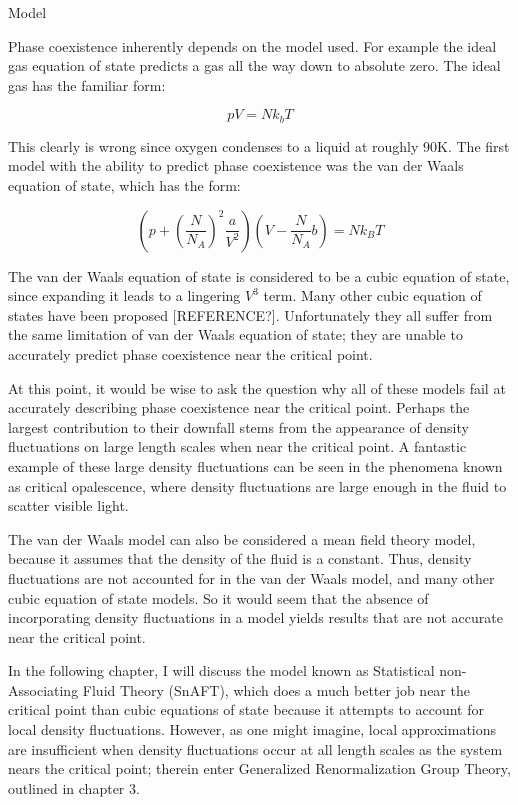 \begin{section}{Model}

Phase coexistence inherently depends on the model used.  For example the ideal gas equation of state predicts a gas all the way down to absolute zero.  The ideal gas has the familiar form:

\begin{equation}
pV=Nk_bT
\end{equation}

  This clearly is wrong since oxygen condenses to a liquid at roughly 90K.  The first model with the ability to predict phase coexistence was the van der Waals equation of state, which has the form:
  
\begin{equation}
\left( p + \left( \frac{N}{N_A} \right)^2 \frac{a}{V^2} \right) \left( V - \frac{N}{N_A}  b \right) = N k_B T
\end{equation} 

The van der Waals equation of state is considered to be a cubic equation of state, since expanding it leads to a lingering $V^3$ term.  Many other cubic equation of states have been proposed [REFERENCE?].  Unfortunately they all suffer from the same limitation of van der Waals equation of state; they are unable to accurately predict phase coexistence near the critical point.

At this point, it would be wise to ask the question why all of these models fail at accurately describing phase coexistence near the critical point.  Perhaps the largest contribution to their downfall stems from the appearance of density fluctuations on large length scales when near the critical point.  A fantastic example of these large density fluctuations can be seen in the phenomena known as critical opalescence, where density fluctuations are large enough in the fluid to scatter visible light.  


The van der Waals model can also be considered a mean field theory model, because it assumes that the density of the fluid is a constant.  Thus, density fluctuations are not accounted for in the van der Waals model, and many other cubic equation of state models.  So it would seem that the absence of incorporating density fluctuations in a model yields results that are not accurate near the critical point.

 

In the following chapter, I will discuss the model known as Statistical non-Associating Fluid Theory (SnAFT), which does a much better job near the critical point than cubic equations of state because it attempts to account for local density fluctuations.  However, as one might imagine, local approximations are insufficient when density fluctuations occur at all length scales as the system nears the critical point; therein enter Generalized Renormalization Group Theory, outlined in chapter 3.




\end{section}